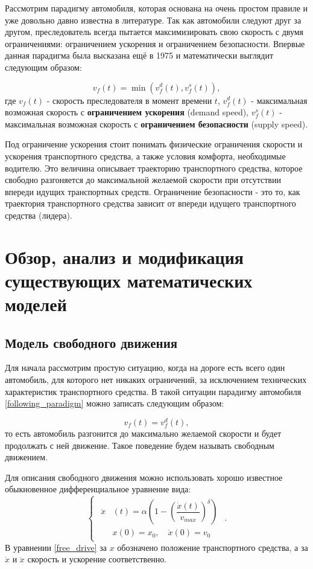 \documentclass[12pt, a4paper]{extarticle}
\numberwithin{equation}{section}
\begin{document}
Рассмотрим парадигму автомобиля, которая основана на очень простом правиле и уже довольно давно известна в литературе. Так как автомобили следуют друг за другом, преследователь всегда пытается максимизировать свою скорость с двумя ограничениями: ограничением ускорения и ограничением безопасности. Впервые данная парадигма была высказана ещё в 1975 \cite{GippsModel} и математически выглядит следующим образом:

\begin{equation} \label{following_paradigm}
v_f(t) = \min(v_f^d(t), v_f^s(t)),
\end{equation}
где $v_f(t)$ - скорость преследователя в момент времени $t$, $v_f^d(t)$ - максимальная возможная скорость с \textbf{ограничением ускорения} (demand speed), $v_f^s(t)$ - максимальная возможная скорость с \textbf{ограничением безопасности} (supply speed).

Под ограничение ускорения стоит понимать физические ограничения скорости и ускорения транспортного средства, а также условия комфорта, необходимые водителю. Это величина описывает траекторию транспортного средства, которое свободно разгоняется до максимальной желаемой скорости при отсутствии впереди идущих транспортных средств. Ограничение безопасности - это то, как траектория транспортного средства зависит от впереди идущего транспортного средства (лидера).

\section{Обзор, анализ и модификация существующих математических моделей}
\subsection{Модель свободного движения}

Для начала рассмотрим простую ситуацию, когда на дороге есть всего один автомобиль, для которого нет никаких ограничений, за исключением технических характеристик транспортного средства. В такой ситуации парадигму автомобиля \eqref{following_paradigm} можно записать следующим образом:

\begin{equation*}
v_f(t) = v_f^d(t),
\end{equation*}
то есть автомобиль разгонится до максимально желаемой скорости и будет продолжать с ней движение. Такое поведение будем называть свободным движением. 

Для описания свободного движения можно использовать хорошо известное обыкновенное дифференциальное уравнение вида: 
\begin{equation} \label{free_drive}
\begin{cases}
\begin{split}
\ddot{x}&(t) = \alpha\left( 1-\left( \dfrac{\dot{x}(t)}{v_{max}}\right)^\delta \right) \\
&x(0)=x_0, \quad \dot{x}(0)=v_{0}
\end{split}
\end{cases}.
\end{equation}
В уравнении \eqref{free_drive} за $x$ обозначено положение транспортного средства, а за $\dot{x}$ и $\ddot{x}$ скорость и ускорение соответственно.
\end{document}
